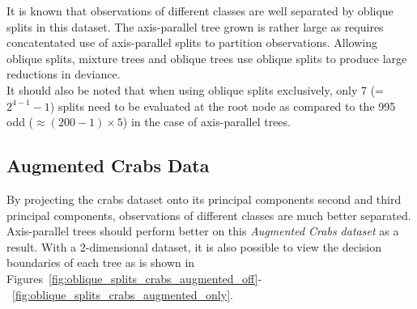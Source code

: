 It is known that observations of different classes are well separated by oblique splits in this dataset. The axis-parallel tree grown is rather large as requires concatentated use of axis-parallel splits to partition observations. Allowing oblique splits, mixture trees and oblique trees use oblique splits to produce large reductions in deviance. \\

It should also be noted that when using oblique splits exclusively, only 7 (=$2^{4-1}-1$) splits need to be evaluated at the root node as compared to the 995 odd ($\approx(200-1)\times 5$) in the case of axis-parallel trees.

\subsection{Augmented Crabs Data}
\label{AugmentedCrabsData}
By projecting the crabs dataset onto its principal components second and third principal components, observations of different classes are much better separated. Axis-parallel trees should perform better on this \emph{Augmented Crabs dataset} as a result. With a 2-dimensional dataset, it is also possible to view the decision boundaries of each tree as is shown in Figures~\ref{fig:oblique_splits_crabs_augmented_off}-~\ref{fig:oblique_splits_crabs_augmented_only}.\\

